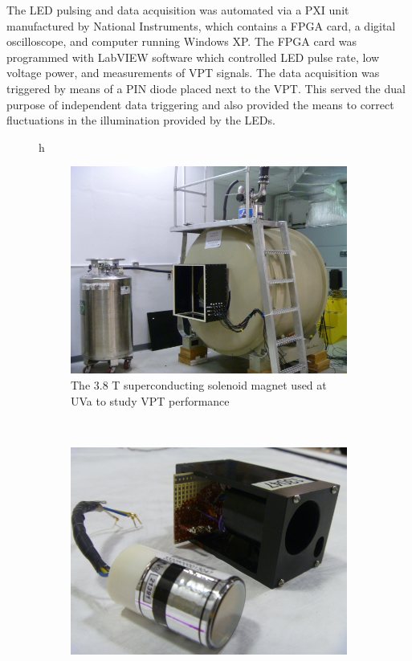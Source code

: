 \par The LED pulsing and data acquisition was automated via a PXI
unit manufactured by National Instruments, which contains a FPGA card,
a digital oscilloscope, and computer running Windows XP.  The FPGA
card was programmed with LabVIEW software which controlled LED pulse
rate, low voltage power, and measurements of VPT signals.  The data
acquisition was triggered by means of a PIN diode placed next to the
VPT.  This served the dual purpose of independent data triggering and
also provided the means to correct fluctuations in the illumination
provided by the LEDs.  

\begin{figure}{h}
    \centering
    \begin{subfigure}[h]{0.450\textwidth}
        \includegraphics[width=\textwidth]{Figures/CMS_Diagrams/UVaRig__Magnet.JPG}
        \caption{The 3.8 T superconducting solenoid magnet used at UVa
        to study VPT performance}\label{fig:uva_vpt_rig_magnet}
      \end{subfigure}
      ~ %
    \begin{subfigure}[h]{0.450\textwidth}
        \includegraphics[width=\textwidth]{Figures/CMS_Diagrams/UVaRig__VPT_and_Housing.JPG}

\end{subfigure}
\end{figure}
